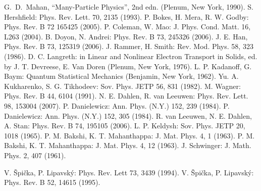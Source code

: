 \documentclass[a4paper,10pt]{jsarticle}
\begin{document}
\begin{thebibliography}{99}
 G.~D.~Mahan, ``Many-Particle Physics'', 2nd edn. (Plenum, New York, 1990).
 S. Hershfield: Phys. Rev. Lett. 70, 2135 (1993).
 P. Bokes, H. Mera, R. W. Godby: Phys. Rev. B 72 165425 (2005).
 P. Coleman, W. Mao: J. Phys. Cond. Matt. 16, L263 (2004).
 B. Doyon, N. Andrei: Phys. Rev. B 73, 245326 (2006).
 J. E. Han, Phys. Rev. B 73, 125319 (2006).
 J. Rammer, H. Smith: Rev. Mod. Phys. 58, 323 (1986).
 D. C. Langreth: in Linear and Nonlinear Electron Transport in Solids, ed. by J. T. Devreese, E. Van Doren (Plenum, New York, 1976).
 L. P. Kadanoff, G. Baym: Quantum Statistical Mechanics (Benjamin, New York, 1962).
 Yu. A. Kukharenko, S. G. Tikhodeev: Sov. Phys. JETP 56, 831 (1982).
 M. Wagner: Phys. Rev. B 44, 6104 (1991).
 N. E. Dahlen, R. van Leeuwen: Phys. Rev. Lett. 98, 153004 (2007).
 P. Danielewicz: Ann. Phys. (N.Y.) 152, 239 (1984).
 P. Danielewicz: Ann. Phys. (N.Y.) 152, 305 (1984).
 R. van Leeuwen, N. E. Dahlen, A. Stan: Phys. Rev. B 74, 195105 (2006).
 L. P. Keldysh: Sov. Phys. JETP 20, 1018 (1965).
 P. M. Bakshi, K. T. Mahanthappa: J. Mat. Phys. 4, 1 (1963).
 P. M. Bakshi, K. T. Mahanthappa: J. Mat. Phys. 4, 12 (1963).
 J. Schwinger: J. Math. Phys. 2, 407 (1961).

 V. \v{S}pi\v{c}ka, P. Lipavsk\'{y}: Phys. Rev. Lett 73, 3439 (1994).
 V. \v{S}pi\v{c}ka, P. Lipavsk\'{y}: Phys. Rev. B 52, 14615 (1995).

\end{thebibliography}
\end{document}
